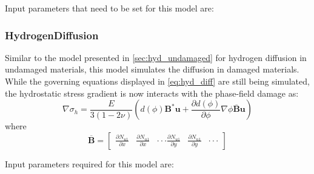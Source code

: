 \documentclass[3p]{elsarticle} %
\begin{document}
Input parameters that need to be set for this model are:


\subsubsection{HydrogenDiffusion}
Similar to the model presented in \cref{sec:hyd_undamaged} for hydrogen diffusion in undamaged materials, this model simulates the diffusion in damaged materials. While the governing equations displayed in \cref{eq:hyd_diff} are still being simulated, the hydrostatic stress gradient is now interacts with the phase-field damage as:
\begin{equation}
	\nabla\sigma_h = \frac{E}{3(1-2\nu)}\left(d(\phi)\bm{B}^*\mathbf{u}+\frac{\partial d(\phi)}{\partial \phi} \nabla \phi \overline{\bm{B}} \mathbf{u} \right)
\end{equation}
where
\begin{equation}
\overline{\bm{B}} = 
\begin{bmatrix}
	\frac{\partial N_{u1}}{\partial x} & \frac{\partial N_{u1}}{\partial x} & \cdot \cdot \cdot \frac{\partial N_{u1}}{\partial y} & \frac{\partial N_{u1}}{\partial y} & \cdot \cdot \cdot
\end{bmatrix}
\end{equation}

Input parameters required for this model are:

\end{document}
